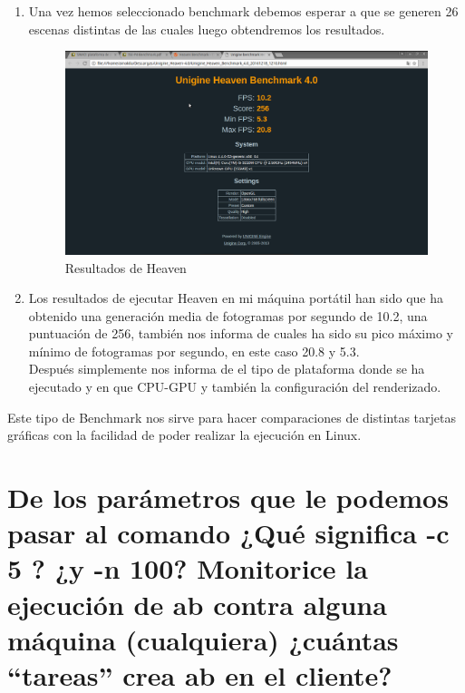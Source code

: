 \begin{enumerate}
	\item Una vez hemos seleccionado benchmark debemos esperar a que se generen 26 escenas distintas de las cuales luego obtendremos los resultados.
	
	\begin{figure}[H] %
		\centering
		\includegraphics[scale=0.3]{pics/heaven7}  %
		\caption{Resultados de Heaven} \label{fig:HEAVEN6}
	\end{figure}

	\item Los resultados de ejecutar Heaven en mi máquina portátil han sido que ha obtenido una generación media de fotogramas por segundo de 10.2, una puntuación de 256, también nos informa de cuales ha sido su pico máximo y mínimo de fotogramas por segundo, en este caso 20.8 y 5.3.\\
	Después simplemente nos informa de el tipo de plataforma donde se ha ejecutado y en que CPU-GPU y también la configuración del renderizado.
	
\end{enumerate}

Este tipo de Benchmark nos sirve para hacer comparaciones de distintas tarjetas gráficas con la facilidad de poder realizar la ejecución en Linux.



\section[Cuestión 2]{De los parámetros que le podemos pasar al comando ¿Qué significa -c 5 ? ¿y -n 100? Monitorice la ejecución de ab contra alguna	máquina (cualquiera) ¿cuántas “tareas” crea ab en el cliente?}

